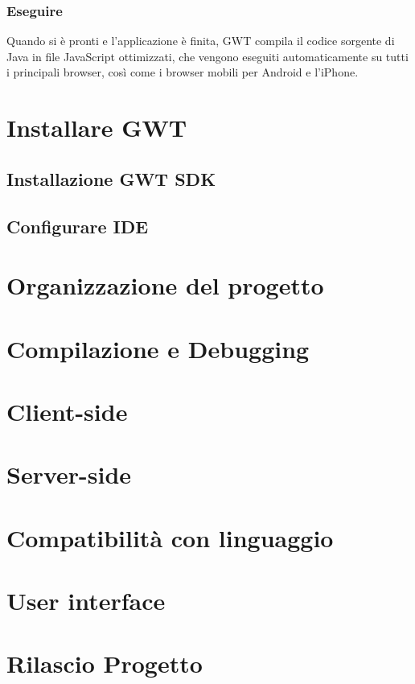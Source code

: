 		\subsubsection{Eseguire}
		Quando si è pronti e l'applicazione è finita, GWT compila il codice sorgente di Java in file JavaScript ottimizzati, che vengono eseguiti automaticamente 
		su tutti i principali browser, così come i browser mobili per Android e l'iPhone.
		
\section{Installare GWT}
	  \subsection{Installazione GWT SDK}
	  \subsection{Configurare IDE}
\section{Organizzazione del progetto}
\section{Compilazione e Debugging}
\section{Client-side}
\section{Server-side}
\section{Compatibilità con linguaggio}
\section{User interface}
\section{Rilascio Progetto}